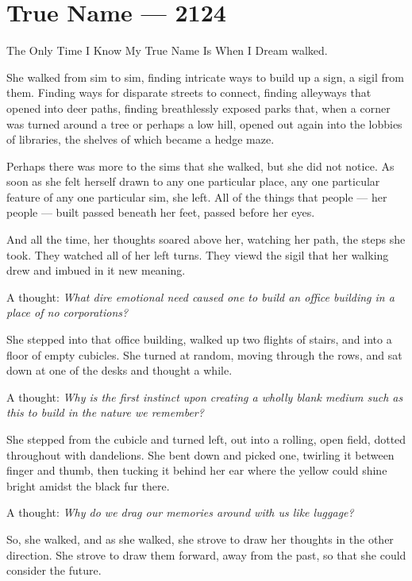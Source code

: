 \hypertarget{true-name-2124}{%
\chapter{True Name — 2124}\label{true-name-2124}}

The Only Time I Know My True Name Is When I Dream walked.

She walked from sim to sim, finding intricate ways to build up a sign, a sigil from them. Finding ways for disparate streets to connect, finding alleyways that opened into deer paths, finding breathlessly exposed parks that, when a corner was turned around a tree or perhaps a low hill, opened out again into the lobbies of libraries, the shelves of which became a hedge maze.

Perhaps there was more to the sims that she walked, but she did not notice. As soon as she felt herself drawn to any one particular place, any one particular feature of any one particular sim, she left. All of the things that people — her people — built passed beneath her feet, passed before her eyes.

And all the time, her thoughts soared above her, watching her path, the steps she took. They watched all of her left turns. They viewd the sigil that her walking drew and imbued in it new meaning.

A thought: \emph{What dire emotional need caused one to build an office building in a place of no corporations?}

She stepped into that office building, walked up two flights of stairs, and into a floor of empty cubicles. She turned at random, moving through the rows, and sat down at one of the desks and thought a while.

A thought: \emph{Why is the first instinct upon creating a wholly blank medium such as this to build in the nature we remember?}

She stepped from the cubicle and turned left, out into a rolling, open field, dotted throughout with dandelions. She bent down and picked one, twirling it between finger and thumb, then tucking it behind her ear where the yellow could shine bright amidst the black fur there.

A thought: \emph{Why do we drag our memories around with us like luggage?}

So, she walked, and as she walked, she strove to draw her thoughts in the other direction. She strove to draw them forward, away from the past, so that she could consider the future.

